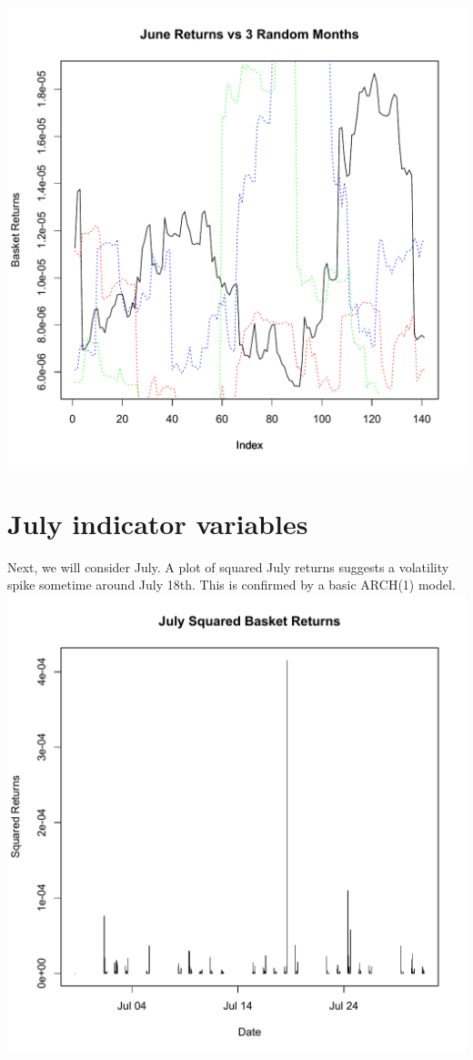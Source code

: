 \documentclass[11pt]{amsart}
\begin{document}
\includegraphics[scale=0.7]{june_3_months.pdf} \\

\newpage
\section{July indicator variables}
Next, we will consider July. A plot of squared July returns suggests a volatility spike sometime around July 18th. This is confirmed by a basic ARCH(1) model. \\

\includegraphics[scale=0.6]{july_squared_basket_ret.pdf} \\
\end{document}
